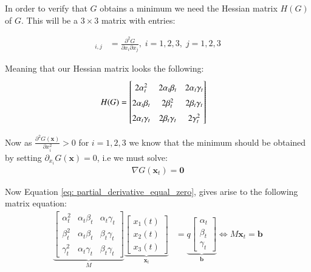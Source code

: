 In order to verify that $G$ obtains a minimum we need the Hessian matrix $H(G)$ of $G$. This will be a $3\times 3$ matrix with entries:  

\begin{align*}
[H(G)]_{i,j} &= 
\frac{
\partial^{2}G
}{
\partial x_{i}\partial x_{j}
}, \; i=1,2,3,\;j=1,2,3
\end{align*}

Meaning that our Hessian matrix looks the following:
\begin{align*}
H(G) &= 
\begingroup
\renewcommand*{\arraystretch}{1.5}
\begin{bmatrix}
2\alpha_{t}^{2} & 
2\alpha_{t} \beta_{t} & 
2\alpha_{t} \gamma_{t} \\ 
2\alpha_{t} \beta_{t} &
2\beta_{t}^{2} &
2\beta_{t} \gamma_{t} \\
2\alpha_{t} \gamma_{t} &
2\beta_{t} \gamma_{t} & 
2\gamma_{t}^{2}
\end{bmatrix}
\endgroup
\end{align*}


Now as $\frac{\partial^{2}G(\mathbf{x}) }{\partial x_{i}^{2}} > 0$ for $i=1,2,3$ we know that the minimum should be obtained by setting $\partial_{x_{i}}G(\mathbf{x}) = 0$, i.e we must solve: 
\begin{align}
\label{eq: partial_derivative_equal_zero}
\nabla G(\mathbf{x}_{t}) = \mathbf{0}    
\end{align}

Now Equation \ref{eq: partial_derivative_equal_zero}, gives arise to the following matrix equation: 
\begin{align*}
\underbrace{
\begin{bmatrix}
\alpha_{t}^{2} & \alpha_{t}\beta_{t} & \alpha_{t}\gamma_{t} \\ 
\beta_{t}^{2} & \alpha_{t}\beta_{t} & \beta_{t}\gamma_{t} \\ 
\gamma_{t}^{2} & \alpha_{t}\gamma_{t} & \beta_{t}\gamma_{t}
\end{bmatrix}
}_{M}
\underbrace{
\begin{bmatrix}
x_{1}(t) \\ 
x_{2}(t) \\ 
x_{3}(t)
\end{bmatrix}
}_{\mathbf{x}_{t}}
&= 
\underbrace{
q 
\begin{bmatrix}
\alpha_{t} \\ 
\beta_{t} \\ 
\gamma_{t} 
\end{bmatrix}
}_{\mathbf{b}}
\iff  
M\mathbf{x}_{t} = \mathbf{b}
\end{align*}

